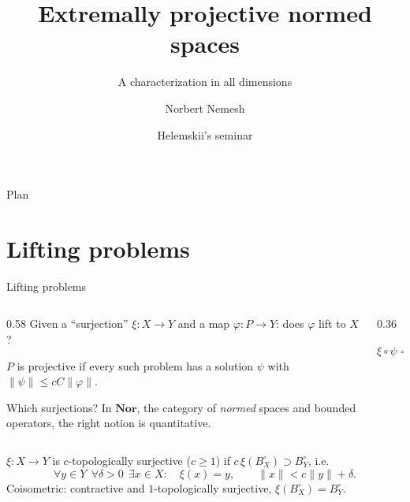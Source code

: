 \documentclass[10pt,aspectratio=169]{beamer}
\title[Extremally projective normed spaces]{Extremally projective normed spaces}
\subtitle{A characterization in all dimensions}
\author[N.\,T.\,Nemesh]{Norbert Nemesh}
\institute{Faculty of Mechanics and Mathematics\\
  Lomonosov Moscow State University}
\date{Helemskii's seminar}
\newcommand{\Nor}{\mathbf{Nor}}
\begin{document}
\begin{frame}
  \titlepage
\end{frame}

\begin{frame}[noframenumbering]{Plan}
  \tableofcontents[hideallsubsections]
\end{frame}

\section{Lifting problems}

\begin{frame}{Lifting problems}
  \begin{columns}[c,onlytextwidth]
    \begin{column}{0.58\textwidth}
      Given a ``surjection'' $\xi\colon X\to Y$ and a map $\varphi\colon P\to Y$:
      does $\varphi$ lift to $X$?
      \medskip

      $P$ is \alert{projective} if every such problem has a solution $\psi$
      with $\|\psi\|\le cC\|\varphi\|$.
      \medskip

      Which surjections? In $\Nor$, the category of \emph{normed} spaces and
      bounded operators, the right notion is quantitative.
    \end{column}
    \begin{column}{0.36\textwidth}
      \centering

      {\small $\xi\circ\psi=\varphi$}
    \end{column}
  \end{columns}
  \medskip
  \begin{definition}
    $\xi\colon X\to Y$ is \alert{$c$-topologically surjective} ($c\ge1$) if
    $c\,\xi(B_X^\circ)\supset B_Y^\circ$, i.e.
    \[
      \forall y\in Y\ \ \forall\delta>0\ \ \exists x\in X:\quad
      \xi(x)=y,\qquad \|x\|<c\|y\|+\delta .
    \]
    \alert{Coisometric}: contractive and $1$-topologically surjective,
    $\xi(B_X^\circ)=B_Y^\circ$.
  \end{definition}
\end{frame}
\end{document}
